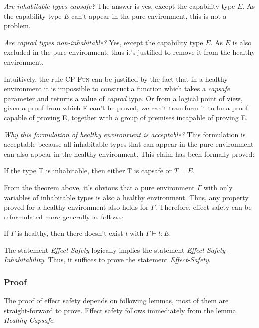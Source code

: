 \emph{Are inhabitable types capsafe?} The answer is yes, except the
capability type $E$. As the capability type $E$ can't appear in the
pure environment, this is not a problem.

\emph{Are caprod types non-inhabitable?} Yes, except the capability
type $E$. As $E$ is also excluded in the pure environment, thus it's
justified to remove it from the healthy environment.

Intuitively, the rule \textsc{CP-Fun} can be justified by the fact
that in a healthy environment it is impossible to construct a function
which takes a \emph{capsafe} parameter and returns a value of
\emph{caprod} type. Or from a logical point of view, given a proof
from which E can't be proved, we can't transform it to be a proof
capable of proving E, together with a group of premises incapable of
proving E.

\emph{Why this formulation of healthy environment is acceptable?} This
formulation is acceptable because all inhabitable types that can
appear in the pure environment can also appear in the healthy
environment. This claim has been formally proved:

\begin{theorem}
  If the type T is inhabitable, then either T is capsafe or $T = E$.
\end{theorem}

From the theorem above, it's obvious that a pure environment $\Gamma$
with only variables of inhabitable types is also a healthy
environment. Thus, any property proved for a healthy environment also
holds for $\Gamma$. Therefore, effect safety can be reformulated more
generally as follows:

\begin{definition}
  If $\Gamma$ is healthy, then there doesn't exist $t$ with
  $\Gamma \vdash t : E$.
\end{definition}

The statement \emph{Effect-Safety} logically implies the statement
\emph{Effect-Safety-Inhabitability}. Thus, it suffices to prove the
statement \emph{Effect-Safety}.

\subsubsection{Proof}

The proof of effect safety depends on following lemmas, most of them
are straight-forward to prove. Effect safety follows immediately from
the lemma \emph{Healthy-Capsafe}.


